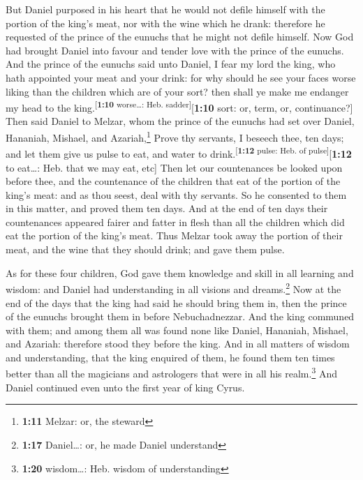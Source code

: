  But Daniel purposed in his heart that he would not defile
himself with the portion of the king's meat, nor with the wine which he
drank: therefore he requested of the prince of the eunuchs that he might
not defile himself.  Now God had brought Daniel into
favour and tender love with the prince of the eunuchs. 
And the prince of the eunuchs said unto Daniel, I fear my lord the king,
who hath appointed your meat and your drink: for why should he see your
faces worse liking than the children which are of your sort? then shall
ye make me endanger my head to the
king.\textsuperscript{{[}\textbf{1:10} worse\ldots: Heb.
sadder{]}}{[}\textbf{1:10} sort: or, term, or, continuance?{]}
 Then said Daniel to Melzar, whom the prince of the
eunuchs had set over Daniel, Hananiah, Mishael, and Azariah,\footnote{\textbf{1:11}
  Melzar: or, the steward}  Prove thy servants, I beseech
thee, ten days; and let them give us pulse to eat, and water to
drink.\textsuperscript{{[}\textbf{1:12} pulse: Heb. of
pulse{]}}{[}\textbf{1:12} to eat\ldots: Heb. that we may eat, etc{]}
 Then let our countenances be looked upon before thee,
and the countenance of the children that eat of the portion of the
king's meat: and as thou seest, deal with thy servants. 
So he consented to them in this matter, and proved them ten days.
 And at the end of ten days their countenances appeared
fairer and fatter in flesh than all the children which did eat the
portion of the king's meat.  Thus Melzar took away the
portion of their meat, and the wine that they should drink; and gave
them pulse.

 As for these four children, God gave them knowledge and
skill in all learning and wisdom: and Daniel had understanding in all
visions and dreams.\footnote{\textbf{1:17} Daniel\ldots: or, he made
  Daniel understand}  Now at the end of the days that the
king had said he should bring them in, then the prince of the eunuchs
brought them in before Nebuchadnezzar.  And the king
communed with them; and among them all was found none like Daniel,
Hananiah, Mishael, and Azariah: therefore stood they before the king.
 And in all matters of wisdom and understanding, that the
king enquired of them, he found them ten times better than all the
magicians and astrologers that were in all his realm.\footnote{\textbf{1:20}
  wisdom\ldots: Heb. wisdom of understanding}  And Daniel
continued even unto the first year of king Cyrus.

